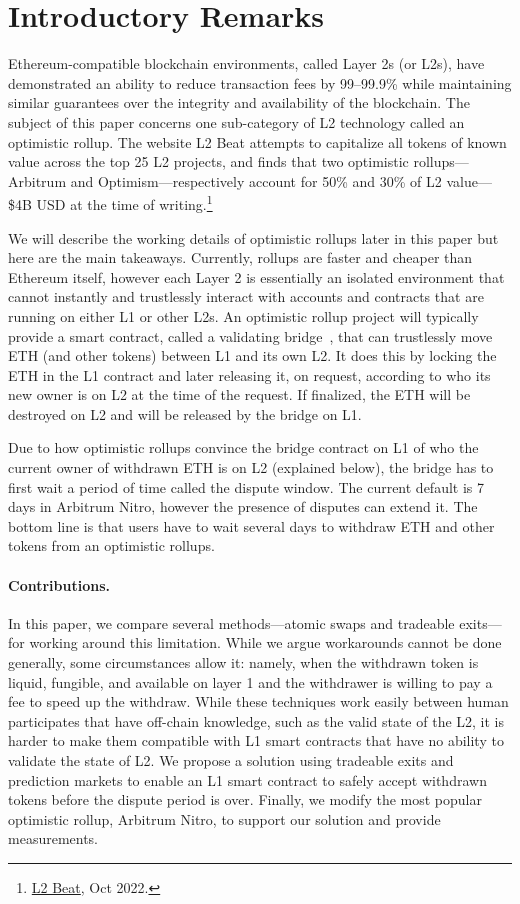 \section{Introductory Remarks}

Ethereum-compatible blockchain environments, called Layer 2s (or L2s), have demonstrated an ability to reduce transaction fees by 99--99.9\% while maintaining similar guarantees over the integrity and availability of the blockchain. The subject of this paper concerns one sub-category of L2 technology called an optimistic rollup. The website L2 Beat attempts to capitalize all tokens of known value across the top 25 L2 projects, and finds that two optimistic rollups---Arbitrum and Optimism---respectively account for 50\% and 30\% of L2 value---\$4B USD at the time of writing.\footnote{\href{https://l2beat.com/scaling/tvl/}{L2 Beat}, Oct 2022.}

We will describe the working details of optimistic rollups later in this paper but here are the main takeaways. Currently, rollups are faster and cheaper than Ethereum itself, however each Layer 2 is essentially an isolated environment that cannot instantly and trustlessly interact with accounts and contracts that are running on either L1 or other L2s. An optimistic rollup project will typically provide a smart contract, called a validating bridge~\cite{}, that can trustlessly move ETH (and other tokens) between L1 and its own L2. It does this by locking the ETH in the L1 contract and later releasing it, on request, according to who its new owner is on L2 at the time of the request. If finalized, the ETH will be destroyed on L2 and will be released by the bridge on L1.

Due to how optimistic rollups convince the bridge contract on L1 of who the current owner of withdrawn ETH is on L2 (explained below), the bridge has to first wait a period of time called the dispute window. The current default is 7 days in Arbitrum Nitro, however the presence of disputes can extend it. The bottom line is that users have to wait several days to withdraw ETH and other tokens from an optimistic rollups. 

\paragraph{Contributions.} In this paper, we compare several methods---atomic swaps and tradeable exits---for working around this limitation. While we argue workarounds cannot be done generally, some circumstances allow it: namely, when the withdrawn token is liquid, fungible, and available on layer 1 and the withdrawer is willing to pay a fee to speed up the withdraw. While these techniques work easily between human participates that have off-chain knowledge, such as the valid state of the L2, it is harder to make them compatible with L1 smart contracts that have no ability to validate the state of L2. We propose a solution using tradeable exits and prediction markets to enable an L1 smart contract to safely accept withdrawn tokens before the dispute period is over. Finally, we modify the most popular optimistic rollup, Arbitrum Nitro, to support our solution and provide measurements. 
 
